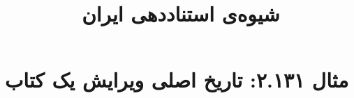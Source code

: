 \documentclass[a4paper,10pt]{article}
\begin{document}
\title{شیوه‌ی استناددهی ایران
 }
\author{}
\date{}
\maketitle



\section*{مثال ۲.۱۳۱: تاریخ اصلی ویرایش یک کتاب}

\cite{قاجار1213}\\
\cite{darwin1859}\\






\end{document}
